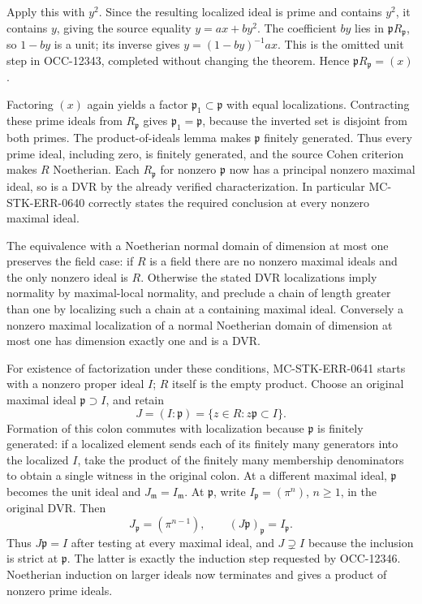Apply this with \(y^2\). Since the resulting localized ideal is prime and contains \(y^2\), it contains \(y\), giving the source equality \(y=ax+by^2\). The coefficient \(by\) lies in \(\mathfrak pR_{\mathfrak p}\), so \(1-by\) is a unit; its inverse gives \(y=(1-by)^{-1}ax\). This is the omitted unit step in OCC-12343, completed without changing the theorem. Hence \(\mathfrak pR_{\mathfrak p}=(x)\).

Factoring \((x)\) again yields a factor \(\mathfrak p_1\subset\mathfrak p\) with equal localizations. Contracting these prime ideals from \(R_{\mathfrak p}\) gives \(\mathfrak p_1=\mathfrak p\), because the inverted set is disjoint from both primes. The product-of-ideals lemma makes \(\mathfrak p\) finitely generated. Thus every prime ideal, including zero, is finitely generated, and the source Cohen criterion makes \(R\) Noetherian. Each \(R_{\mathfrak p}\) for nonzero \(\mathfrak p\) now has a principal nonzero maximal ideal, so is a DVR by the already verified characterization. In particular MC-\AlgebraIdentifierBreak{}STK-\AlgebraIdentifierBreak{}ERR-\AlgebraIdentifierBreak{}0640 correctly states the required conclusion at every nonzero maximal ideal.

The equivalence with a Noetherian normal domain of dimension at most one preserves the field case: if \(R\) is a field there are no nonzero maximal ideals and the only nonzero ideal is \(R\). Otherwise the stated DVR localizations imply normality by maximal-local normality, and preclude a chain of length greater than one by localizing such a chain at a containing maximal ideal. Conversely a nonzero maximal localization of a normal Noetherian domain of dimension at most one has dimension exactly one and is a DVR.

For existence of factorization under these conditions, MC-\AlgebraIdentifierBreak{}STK-\AlgebraIdentifierBreak{}ERR-\AlgebraIdentifierBreak{}0641 starts with a nonzero proper ideal \(I\); \(R\) itself is the empty product. Choose an original maximal ideal \(\mathfrak p\supset I\), and retain \[
 J=(I:\mathfrak p)=\{z\in R:z\mathfrak p\subset I\}.
\] Formation of this colon commutes with localization because \(\mathfrak p\) is finitely generated: if a localized element sends each of its finitely many generators into the localized \(I\), take the product of the finitely many membership denominators to obtain a single witness in the original colon. At a different maximal ideal, \(\mathfrak p\) becomes the unit ideal and \(J_{\mathfrak m}=I_{\mathfrak m}\). At \(\mathfrak p\), write \(I_{\mathfrak p}=(\pi^n)\), \(n\ge1\), in the original DVR. Then \[
 J_{\mathfrak p}=(\pi^{n-1}),\qquad
 (J\mathfrak p)_{\mathfrak p}=I_{\mathfrak p}.
\] Thus \(J\mathfrak p=I\) after testing at every maximal ideal, and \(J\supsetneq I\) because the inclusion is strict at \(\mathfrak p\). The latter is exactly the induction step requested by OCC-12346. Noetherian induction on larger ideals now terminates and gives a product of nonzero prime ideals.

